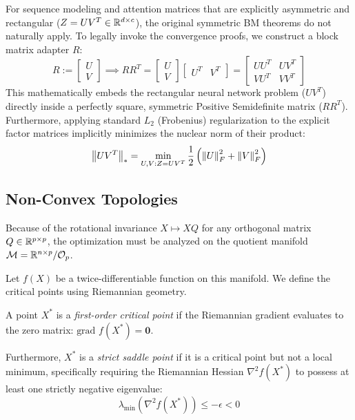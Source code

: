 For sequence modeling and attention matrices that are explicitly asymmetric and rectangular ($Z = UV^T \in \mathbb{R}^{d \times c}$), the original symmetric BM theorems do not naturally apply. To legally invoke the convergence proofs, we construct a block matrix adapter $R$:
\begin{equation}
R := \begin{bmatrix} U \\ V \end{bmatrix} \implies RR^T = \begin{bmatrix} U \\ V \end{bmatrix} \begin{bmatrix} U^T & V^T \end{bmatrix} = \begin{bmatrix} UU^T & UV^T \\ VU^T & VV^T \end{bmatrix}
\end{equation}
This mathematically embeds the rectangular neural network problem ($UV^T$) directly inside a perfectly square, symmetric Positive Semidefinite matrix ($RR^T$). Furthermore, applying standard $L_2$ (Frobenius) regularization to the explicit factor matrices implicitly minimizes the nuclear norm of their product:
\begin{equation}
\left\lVert UV^T\right\rVert_* = \min_{U,V : Z=UV^T} \frac{1}{2} \left( \left\lVert U\right\rVert_F^2 + \left\lVert V\right\rVert_F^2 \right)
\end{equation}

\subsection{Non-Convex Topologies}
Because of the rotational invariance $X \mapsto XQ$ for any orthogonal matrix $Q \in \mathbb{R}^{p \times p}$, the optimization must be analyzed on the quotient manifold $\mathcal{M} = \mathbb{R}^{n \times p} / \mathcal{O}_p$. 

Let $f(X)$ be a twice-differentiable function on this manifold. We define the critical points using Riemannian geometry.

\begin{definition}
A point $X^*$ is a \textit{first-order critical point} if the Riemannian gradient evaluates to the zero matrix: $\text{grad } f(X^*) = \mathbf{0}$. 

Furthermore, $X^*$ is a \textit{strict saddle point} if it is a critical point but not a local minimum, specifically requiring the Riemannian Hessian $\nabla^2 f(X^*)$ to possess at least one strictly negative eigenvalue:
\begin{equation}
\lambda_{\min}(\nabla^2 f(X^*)) \le -\epsilon < 0
\label{eq:strict_saddle}
\end{equation}
\end{definition}

